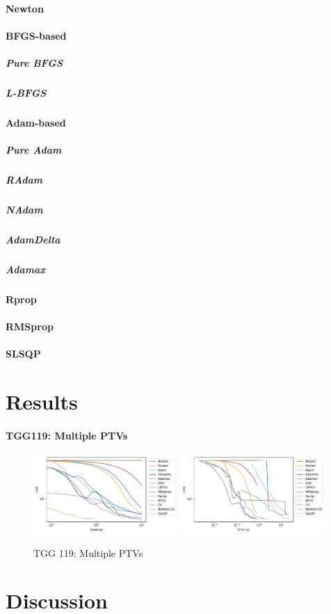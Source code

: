 \documentclass[a4paper]{article}
\begin{document}
	\paragraph{Newton}

	\paragraph{BFGS-based}
	\subparagraph{Pure BFGS}
	\subparagraph{L-BFGS}

	\paragraph{Adam-based}
	\subparagraph{Pure Adam}
	\subparagraph{RAdam}
	\subparagraph{NAdam}
	\subparagraph{AdamDelta}
	\subparagraph{Adamax}

	\paragraph{Rprop}
	
	\paragraph{RMSprop}
	
	\paragraph{SLSQP}
	
	
	
	\section{Results}
	\paragraph{TGG119: Multiple PTVs}
	\begin{figure}[H]
		\centering
		\includegraphics[width=0.49\textwidth]{figures/TGG119Multi-iter.pdf}		\includegraphics[width=0.49\textwidth]{figures/TGG119Multi-time.pdf}
		\caption{TGG 119: Multiple PTVs}
		\label{fig:tgg119multi}
	\end{figure}
	
	
	
	\section{Discussion}
	
	
	
	
\end{document}
